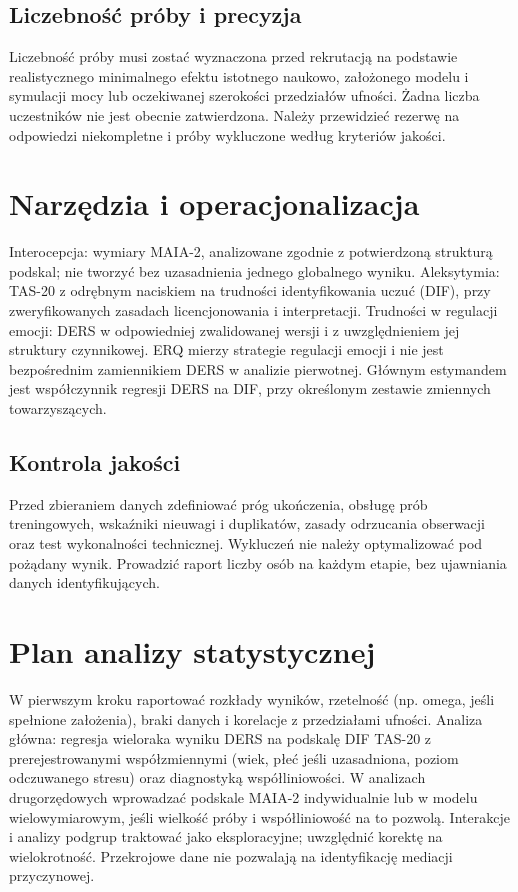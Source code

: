\documentclass[11pt,a4paper]{article}
\begin{document}
\subsection{Liczebność próby i precyzja}
Liczebność próby musi zostać wyznaczona przed rekrutacją na podstawie realistycznego minimalnego efektu istotnego naukowo, założonego modelu i symulacji mocy lub oczekiwanej szerokości przedziałów ufności. Żadna liczba uczestników nie jest obecnie zatwierdzona. Należy przewidzieć rezerwę na odpowiedzi niekompletne i próby wykluczone według kryteriów jakości.
\section{Narzędzia i operacjonalizacja}
Interocepcja: wymiary MAIA-2, analizowane zgodnie z potwierdzoną strukturą podskal; nie tworzyć bez uzasadnienia jednego globalnego wyniku. Aleksytymia: TAS-20 z odrębnym naciskiem na trudności identyfikowania uczuć (DIF), przy zweryfikowanych zasadach licencjonowania i interpretacji. Trudności w regulacji emocji: DERS w odpowiedniej zwalidowanej wersji i z uwzględnieniem jej struktury czynnikowej. ERQ mierzy strategie regulacji emocji i nie jest bezpośrednim zamiennikiem DERS w analizie pierwotnej. Głównym estymandem jest współczynnik regresji DERS na DIF, przy określonym zestawie zmiennych towarzyszących.
\subsection{Kontrola jakości}
Przed zbieraniem danych zdefiniować próg ukończenia, obsługę prób treningowych, wskaźniki nieuwagi i duplikatów, zasady odrzucania obserwacji oraz test wykonalności technicznej. Wykluczeń nie należy optymalizować pod pożądany wynik. Prowadzić raport liczby osób na każdym etapie, bez ujawniania danych identyfikujących.
\section{Plan analizy statystycznej}
W pierwszym kroku raportować rozkłady wyników, rzetelność (np. omega, jeśli spełnione założenia), braki danych i korelacje z przedziałami ufności. Analiza główna: regresja wieloraka wyniku DERS na podskalę DIF TAS-20 z prerejestrowanymi współzmiennymi (wiek, płeć jeśli uzasadniona, poziom odczuwanego stresu) oraz diagnostyką współliniowości. W analizach drugorzędowych wprowadzać podskale MAIA-2 indywidualnie lub w modelu wielowymiarowym, jeśli wielkość próby i współliniowość na to pozwolą. Interakcje i analizy podgrup traktować jako eksploracyjne; uwzględnić korektę na wielokrotność. Przekrojowe dane nie pozwalają na identyfikację mediacji przyczynowej.
\end{document}
